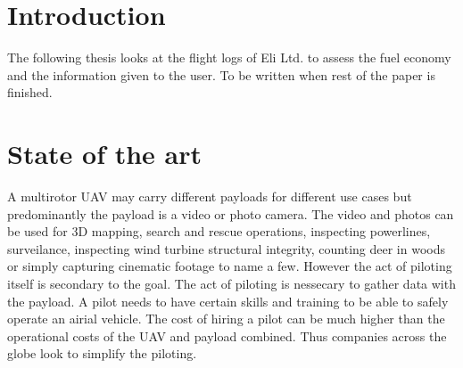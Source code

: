 \documentclass[12pt,oneside]{reedthesis}
\theoremstyle{definition}
\theoremstyle{definition}
\theoremstyle{definition}
\theoremstyle{remark}
\begin{document}
  \listoffigures

  \listoftables

\mainmatter %
\pagestyle{fancyplain} %

\chapter*{Introduction}\label{introduction}

The following thesis looks at the flight logs of Eli Ltd. to assess the
fuel economy and the information given to the user. To be written when
rest of the paper is finished.

\chapter{State of the art}\label{state}

A multirotor UAV may carry different payloads for different use cases
but predominantly the payload is a video or photo camera. The video and
photos can be used for 3D mapping, search and rescue operations,
inspecting powerlines, surveilance, inspecting wind turbine structural
integrity, counting deer in woods or simply capturing cinematic footage
to name a few. However the act of piloting itself is secondary to the
goal. The act of piloting is nessecary to gather data with the payload.
A pilot needs to have certain skills and training to be able to safely
operate an airial vehicle. The cost of hiring a pilot can be much higher
than the operational costs of the UAV and payload combined. Thus
companies across the globe look to simplify the piloting.
\end{document}
